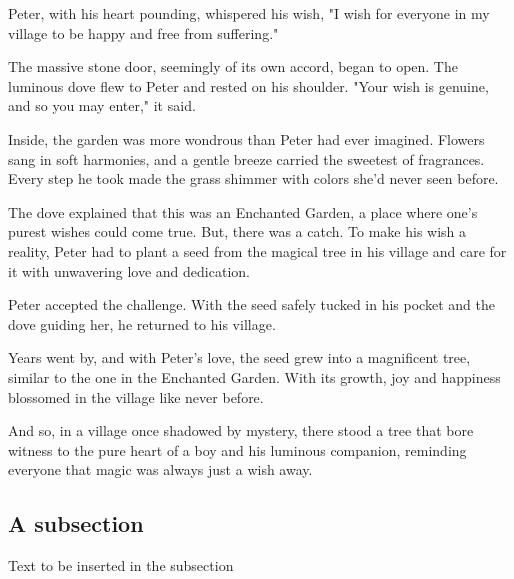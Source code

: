 \documentclass[10pt, fullpage, a4paper, titlepage]{article}
\begin{document}
Peter, with his heart pounding, whispered his wish, "I wish for everyone in my village to be happy and free from suffering."

The massive stone door, seemingly of its own accord, began to open. The luminous dove flew to Peter and rested on his shoulder. "Your wish is genuine, and so you may enter," it said.

Inside, the garden was more wondrous than Peter had ever imagined. Flowers sang in soft harmonies, and a gentle breeze carried the sweetest of fragrances. Every step he took made the grass shimmer with colors she'd never seen before.

The dove explained that this was an Enchanted Garden, a place where one’s purest wishes could come true. But, there was a catch. To make his wish a reality, Peter had to plant a seed from the magical tree in his village and care for it with unwavering love and dedication.

Peter accepted the challenge. With the seed safely tucked in his pocket and the dove guiding her, he returned to his village.

Years went by, and with Peter's love, the seed grew into a magnificent tree, similar to the one in the Enchanted Garden. With its growth, joy and happiness blossomed in the village like never before.

And so, in a village once shadowed by mystery, there stood a tree that bore witness to the pure heart of a boy and his luminous companion, reminding everyone that magic was always just a wish away.


\subsection{A subsection}
Text to be inserted in the subsection
\end{document}
